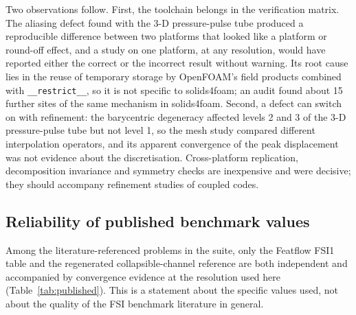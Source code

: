 Two observations follow.
First, the toolchain belongs in the verification matrix.
The aliasing defect found with the 3-D pressure-pulse tube produced a reproducible difference between two platforms that looked like a platform or round-off effect, and a study on one platform, at any resolution, would have reported either the correct or the incorrect result without warning.
Its root cause lies in the reuse of temporary storage by OpenFOAM's field products combined with \texttt{\_\_restrict\_\_}, so it is not specific to solids4foam; an audit found about 15 further sites of the same mechanism in solids4foam.
Second, a defect can switch on with refinement: the barycentric degeneracy affected levels 2 and 3 of the 3-D pressure-pulse tube but not level 1, so the mesh study compared different interpolation operators, and its apparent convergence of the peak displacement was not evidence about the discretisation.
Cross-platform replication, decomposition invariance and symmetry checks are inexpensive and were decisive; they should accompany refinement studies of coupled codes.

\subsection{Reliability of published benchmark values}\label{sec:published_reliability}

Among the literature-referenced problems in the suite, only the Featflow FSI1 table and the regenerated collapsible-channel reference are both independent and accompanied by convergence evidence at the resolution used here (Table~\ref{tab:published}).
This is a statement about the specific values used, not about the quality of the FSI benchmark literature in general.

